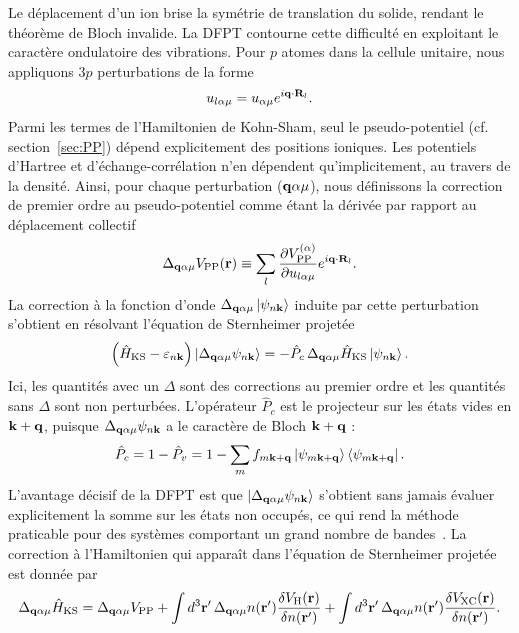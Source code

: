 Le déplacement d'un ion brise la symétrie de translation du solide, rendant le théorème de Bloch invalide. La DFPT contourne cette difficulté en exploitant le caractère ondulatoire des vibrations. Pour $p$ atomes dans la cellule unitaire, nous appliquons $3p$ perturbations de la forme
\begin{equation}
    u_{l\alpha\mu} = u_{\alpha\mu}e^{i\mathbf{q}\cdot\mathbf{R}_l}.
\end{equation}
Parmi les termes de l'Hamiltonien de Kohn-Sham, seul le pseudo-potentiel (cf. section~\ref{sec:PP}) dépend explicitement des positions ioniques. Les potentiels d'Hartree et d'échange-corrélation n'en dépendent qu'implicitement, au travers de la densité. Ainsi, pour chaque perturbation ($\mathbf{q}\alpha\mu$), nous définissons la correction de premier ordre au pseudo-potentiel comme étant la dérivée par rapport au déplacement collectif
\begin{equation}
    \Delta_{\mathbf{q}\alpha\mu}V_\text{PP}(\mathbf{r}) \equiv \sum_l \frac{\partial V_\text{PP}^{(\alpha)}}{\partial u_{l\alpha\mu}}e^{i\mathbf{q}\cdot\mathbf{R}_l}.
    \label{eqn:deltaVPP}
\end{equation}
La correction à la fonction d'onde $\Delta_{\mathbf{q}\alpha\mu}\ket{\psi_{n\mathbf{k}}}$ induite par cette perturbation s'obtient en résolvant l'équation de Sternheimer projetée
\begin{equation}
    \left(\hat{H}_\text{KS}-\varepsilon_{n\mathbf{k}}\right)\ket{\Delta_{\mathbf{q}\alpha\mu}\psi_{n\mathbf{k}}} = -\hat{P}_c\,\Delta_{\mathbf{q}\alpha\mu}\hat{H}_\text{KS}\ket{\psi_{n\mathbf{k}}}.
    \label{eqn:Sternheimer_projetée}
\end{equation}
Ici, les quantités avec un $\Delta$ sont des corrections au premier ordre et les quantités sans $\Delta$ sont non perturbées. L'opérateur $\hat{P}_c$ est le projecteur sur les états vides en $\mathbf{k}+\mathbf{q}$, puisque $\Delta_{\mathbf{q}\alpha\mu}\psi_{n\mathbf{k}}$ a le caractère de Bloch $\mathbf{k}+\mathbf{q}$ :
\begin{equation}
    \hat{P}_c = 1-\hat{P}_v = 1 - \sum_m f_{m\mathbf{k}+\mathbf{q}}\ket{\psi_{m\mathbf{k}+\mathbf{q}}}\bra{\psi_{m\mathbf{k}+\mathbf{q}}}.
\end{equation}
L'avantage décisif de la DFPT est que $\ket{\Delta_{\mathbf{q}\alpha\mu}\psi_{n\mathbf{k}}}$ s'obtient sans jamais évaluer explicitement la somme sur les états non occupés, ce qui rend la méthode praticable pour des systèmes comportant un grand nombre de bandes~\cite{baroniPhononsRelatedCrystal2001a}. La correction à l'Hamiltonien qui apparaît dans l'équation de Sternheimer projetée est donnée par
\begin{equation}
    \Delta_{\mathbf{q}\alpha\mu} \hat{H}_\text{KS} = \Delta_{\mathbf{q}\alpha\mu}V_\text{PP} + \int d^3\mathbf{r}'\,\Delta_{\mathbf{q}\alpha\mu} n(\mathbf{r}')\frac{\delta V_\text{H}(\mathbf{r})}{\delta n(\mathbf{r}')}+\int d^3\mathbf{r}'\,\Delta_{\mathbf{q}\alpha\mu}n(\mathbf{r}')\frac{\delta V_\text{XC}(\mathbf{r})}{\delta n(\mathbf{r}')}.
    \label{eqn:deltaH}
\end{equation}
